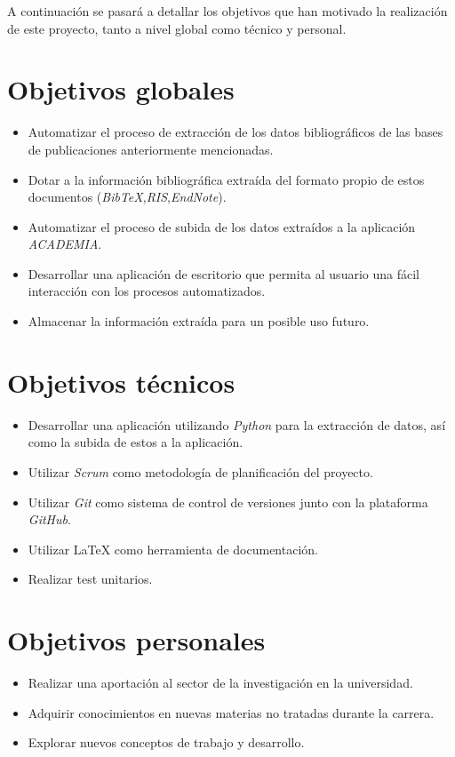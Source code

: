 
A continuación se pasará a detallar los objetivos que han motivado la realización de este proyecto, tanto a nivel global como técnico y personal.

\section{Objetivos globales}

\begin{itemize}
	\item Automatizar el proceso de extracción de los datos bibliográficos de las bases de publicaciones anteriormente mencionadas.
	
	\item Dotar a la información bibliográfica extraída del formato propio de estos documentos (\emph{BibTeX},\emph{RIS},\emph {EndNote}).
	
	\item Automatizar el proceso de subida de los datos extraídos a la aplicación \emph {ACADEMIA}.
	
	\item Desarrollar una aplicación de escritorio que permita al usuario una fácil interacción con los procesos automatizados.
	
	\item Almacenar la información extraída para un posible uso futuro.
\end{itemize}

\section{Objetivos técnicos}

\begin{itemize}
	\item Desarrollar una aplicación utilizando \emph{Python} para la extracción de datos, así como la subida de estos a la aplicación.
	
	\item Utilizar \emph{Scrum} como metodología de planificación del proyecto.
	
	\item Utilizar \emph{Git} como sistema de control de versiones junto con la plataforma \emph {GitHub}.
	\item Utilizar LaTeX como herramienta de documentación.
	
	\item Realizar test unitarios.
\end{itemize}

\section{Objetivos personales}

\begin{itemize}

	\item Realizar una aportación al sector de la investigación en la universidad.
	
	 \item Adquirir conocimientos en nuevas materias no tratadas durante la carrera.
	 
	 \item Explorar nuevos conceptos de trabajo y desarrollo.
	 
\end{itemize}
